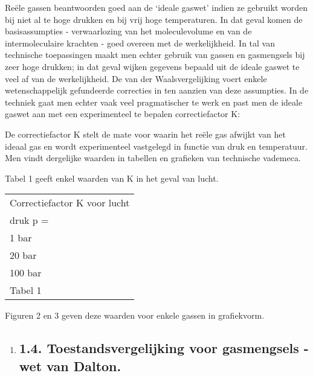 \documentclass[]{article}
\begin{document}
Reële gassen beantwoorden goed aan de `ideale gaswet' indien ze gebruikt
worden bij niet al te hoge drukken en bij vrij hoge temperaturen. In dat
geval komen de basisassumpties - verwaarlozing van het moleculevolume en
van de intermoleculaire krachten - goed overeen met de werkelijkheid. In
tal van technische toepassingen maakt men echter gebruik van gassen en
gasmengsels bij zeer hoge drukken; in dat geval wijken gegevens bepaald
uit de ideale gaswet te veel af van de werkelijkheid. De van der
Waalsvergelijking voert enkele wetenschappelijk gefundeerde correcties
in ten aanzien van deze assumpties. In de techniek gaat men echter vaak
veel pragmatischer te werk en past men de ideale gaswet aan met een
experimenteel te bepalen correctiefactor K:

De correctiefactor K stelt de mate voor waarin het reële gas afwijkt van
het ideaal gas en wordt experimenteel vastgelegd in functie van druk en
temperatuur. Men vindt dergelijke waarden in tabellen en grafieken van
technische vademeca.

Tabel 1 geeft enkel waarden van K in het geval van lucht.

\begin{longtable}[c]{@{}l@{}}
\toprule
Correctiefactor K voor lucht\tabularnewline
druk p =\tabularnewline
1 bar\tabularnewline
20 bar\tabularnewline
100 bar\tabularnewline
Tabel 1\tabularnewline
\bottomrule
\end{longtable}

Figuren 2 en 3 geven deze waarden voor enkele gassen in grafiekvorm.

\begin{enumerate}
\item
  \subsection{}\label{section-3}

  \subsection{}\label{section-4}

  \subsection{1.4. Toestandsvergelijking voor gasmengsels - wet van
  Dalton.}\label{toestandsvergelijking-voor-gasmengsels---wet-van-dalton.}
\end{enumerate}
\end{document}
